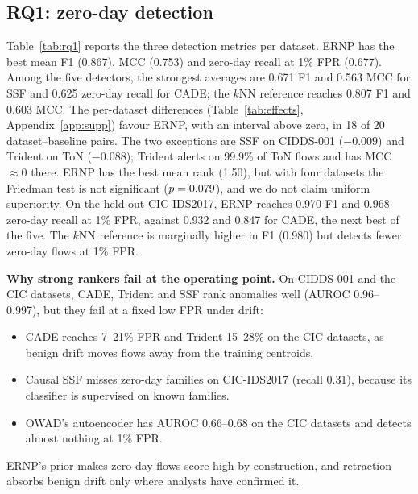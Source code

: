 \documentclass[a4paper,fleqn]{cas-dc}
\newcommand{\ERNP}{ERNP\xspace}
\begin{document}
\subsection{RQ1: zero-day detection}
\label{sec:rq1}
Table~\ref{tab:rq1} reports the three detection metrics per dataset. \ERNP has the best mean F1 (0.867), MCC (0.753) and zero-day recall at 1\% FPR (0.677). Among the five detectors, the strongest averages are 0.671 F1 and 0.563 MCC for SSF and 0.625 zero-day recall for CADE; the $k$NN reference reaches 0.807 F1 and 0.603 MCC. The per-dataset differences (Table~\ref{tab:effects}, Appendix~\ref{app:supp}) favour \ERNP, with an interval above zero, in 18 of 20 dataset--baseline pairs. The two exceptions are SSF on CIDDS-001 ($-0.009$) and Trident on ToN ($-0.088$); Trident alerts on 99.9\% of ToN flows and has MCC $\approx0$ there. \ERNP has the best mean rank (1.50), but with four datasets the Friedman test is not significant ($p=0.079$), and we do not claim uniform superiority. On the held-out CIC-IDS2017, \ERNP reaches 0.970 F1 and 0.968 zero-day recall at 1\% FPR, against 0.932 and 0.847 for CADE, the next best of the five. The $k$NN reference is marginally higher in F1 (0.980) but detects fewer zero-day flows at 1\% FPR.

\begin{table}[t]
\centering
\caption{RQ1: mean$\pm$std over five seeds, causal protocol, $B=200$. Bold: best in the column within each metric. GBM+AL: same classifier, features and alert-group labelling without the novelty prior.}
\label{tab:rq1}
\scriptsize

\end{table}

\textbf{Why strong rankers fail at the operating point.} On CIDDS-001 and the CIC datasets, CADE, Trident and SSF rank anomalies well (AUROC 0.96--0.997), but they fail at a fixed low FPR under drift:
\begin{itemize}
  \item CADE reaches 7--21\% FPR and Trident 15--28\% on the CIC datasets, as benign drift moves flows away from the training centroids.
  \item Causal SSF misses zero-day families on CIC-IDS2017 (recall 0.31), because its classifier is supervised on known families.
  \item OWAD's autoencoder has AUROC 0.66--0.68 on the CIC datasets and detects almost nothing at 1\% FPR.
\end{itemize}
\ERNP's prior makes zero-day flows score high by construction, and retraction absorbs benign drift only where analysts have confirmed it.
\end{document}
